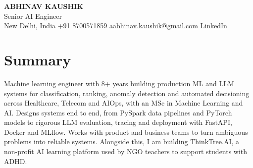 \documentclass[10pt,a4paper]{article}
\begin{document}
\begin{center}
  {\LARGE\bfseries ABHINAV KAUSHIK}\\[2pt]
  {\large Senior AI Engineer}\\[2pt]
  New Delhi, India \textbar{} +91 8700571859 \textbar{} \href{mailto:aabhinav.kaushik@gmail.com}{aabhinav.kaushik@gmail.com} \textbar{} \href{https://www.linkedin.com/in/abhinav-kaushik10/}{LinkedIn}  
\end{center}

\section{Summary}
Machine learning engineer with 8+ years building production ML and LLM systems for classification, ranking, anomaly detection and automated decisioning across Healthcare, Telecom and AIOps, with an MSc in Machine Learning and AI. Designs systems end to end, from PySpark data pipelines and PyTorch models to rigorous LLM evaluation, tracing and deployment with FastAPI, Docker and MLflow. Works with product and business teams to turn ambiguous problems into reliable systems. Alongside this, I am building ThinkTree.AI, a non-profit AI learning platform used by NGO teachers to support students with ADHD.
\end{document}
